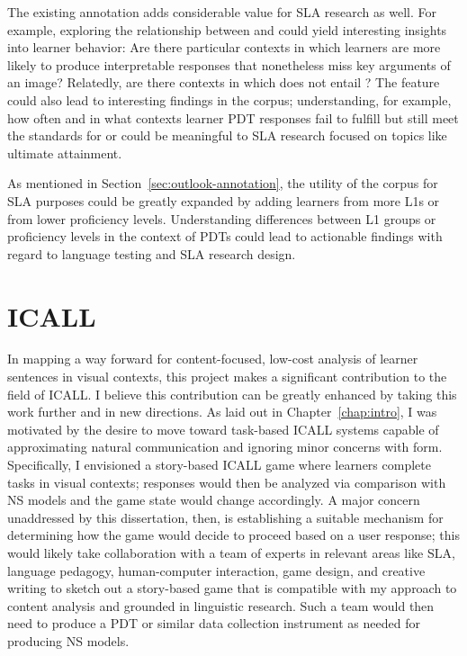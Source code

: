 The existing annotation adds considerable value for SLA research as well. For example, exploring the relationship between  and  could yield interesting insights into learner behavior: Are there particular contexts in which learners are more likely to produce interpretable responses that nonetheless miss key arguments of an image? Relatedly, are there contexts in which  does not entail ? The  feature could also lead to interesting findings in the corpus; understanding, for example, how often and in what contexts learner PDT responses fail to fulfill  but still meet the standards for  or  could be meaningful to SLA research focused on topics like ultimate attainment.

As mentioned in Section~\ref{sec:outlook-annotation}, the utility of the corpus for SLA purposes could be greatly expanded by adding learners from more L1s or from lower proficiency levels. Understanding differences between L1 groups or proficiency levels in the context of PDTs could lead to actionable findings with regard to language testing and SLA research design.

\section{ICALL}
\label{sec:outlook-icall}

In mapping a way forward for content-focused, low-cost analysis of learner sentences in visual contexts, this project makes a significant contribution to the field of ICALL. I believe this contribution can be greatly enhanced by taking this work further and in new directions. As laid out in Chapter~\ref{chap:intro}, I was motivated by the desire to move toward task-based ICALL systems capable of approximating natural communication and ignoring minor concerns with form. Specifically, I envisioned a story-based ICALL game where learners complete tasks in visual contexts; responses would then be analyzed via comparison with NS models and the game state would change accordingly. A major concern unaddressed by this dissertation, then, is establishing a suitable mechanism for determining how the game would decide to proceed based on a user response; this would likely take collaboration with a team of experts in relevant areas like SLA, language pedagogy, human-computer interaction, game design, and creative writing to sketch out a story-based game that is compatible with my approach to content analysis and grounded in linguistic research. Such a team would then need to produce a PDT or similar data collection instrument as needed for producing NS models.

